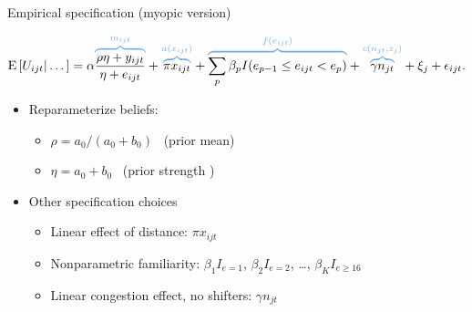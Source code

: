 \documentclass[slides, aspectratio=169]{beamer}
\newcommand{\bit}{\begin{itemize}}
\newcommand{\eit}{\end{itemize}}
\begin{document}

\begin{frame}[t]{Empirical specification (myopic version)} 

\vskip-24pt \pause 

\begin{equation*}
    \text{E} \left[ U_{ijt} | \dots \right] =
    \alpha {\color{spiritblue} \overbrace{\color{black} \frac{\rho \eta + y_{ijt}}{\eta + e_{ijt}} }^{m_{ijt}} }
    + {\color{spiritblue} \overbrace{ \color{black} \pi x_{ijt} }^{u(x_{ijt})} }
    + {\color{spiritblue} \overbrace{\color{black} \sum_{p}\beta_{p} I(e_{p-1}\leq e_{ijt} < e_{p}) }^{f(e_{ijt})} }
    + {\color{spiritblue} \overbrace{\color{black} \gamma n_{jt} }^{c(n_{jt}, z_j)} } + \xi_j + \epsilon_{ijt} .
\end{equation*}

\begin{itemize}

\item Reparameterize beliefs:
\bit
    \item $\rho = a_0 / (a_0 + b_0)$ \ (prior mean)
    \item $\eta = a_0 + b_0$ \ (prior strength )
\eit
\medskip

\item Other specification choices
\bit
    \item Linear effect of distance: $\pi x_{ijt}$
    \item Nonparametric familiarity: $\beta_1 I_{e = 1}$, $\beta_2 I_{e = 2}$, \dots, $\beta_K I_{e \geq 16}$
    \item Linear congestion effect, no shifters: $\gamma n_{jt}$
\eit

\end{itemize}

\end{frame}

\end{document}
